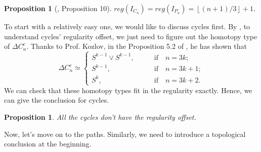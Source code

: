 \documentclass[dvipsnames,10pt]{article}
\newtheorem{proposition}[theorem]{Proposition}
\begin{document}
\begin{proposition}[\cite{woodroofe2014matchings}, Proposition 10]

$reg(I_{C_n})=reg(I_{P_n})=\left \lfloor(n+1)/3 \right \rfloor+1$.

\end{proposition}
To start with a relatively easy one, we would like to discuss cycles first. By , to understand cycles' regularity offset, we just need to figure out the homotopy type of $\Delta C_n^c$. Thanks to Prof. Kozlov, in the Proposition 5.2 of \cite{kozlov1999complexes}, he has shown that
\begin{equation*}
    \Delta C_n^c\simeq\left\{\begin{matrix}
 S^{k-1}\vee S^{k-1},\qquad &\text{if}\quad  n=3k;\\
 S^{k-1},\qquad &\text{if}\quad  n=3k+1;\\
 S^k,\qquad &\text{if}\quad  n=3k+2.
\end{matrix}\right.
\end{equation*}
We can check that these homotopy types fit in the regularity exactly. Hence, we can give the conclusion for cycles.

\begin{proposition}
    All the cycles don't have the regularity offset.
\end{proposition}
Now, let's move on to the paths. Similarly, we need to introduce a topological conclusion at the beginning.
\end{document}
